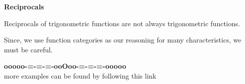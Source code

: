 \documentclass{ximera}
\begin{document}
\begin{warning} \textbf{\textcolor{red!70!black}{Reciprocals}} 


Reciprocals of trigonometric functions are not always trigonometric functions.


Since, we use function categories as our reasoning for many characteristics, we must be careful.


\end{warning}










































\begin{onlineOnly}
\begin{center}
\textbf{\textcolor{green!50!black}{ooooo-=-=-=-ooOoo-=-=-=-ooooo}} \\

more examples can be found by following this link\\ 

\end{center}
\end{onlineOnly}
\end{document}
